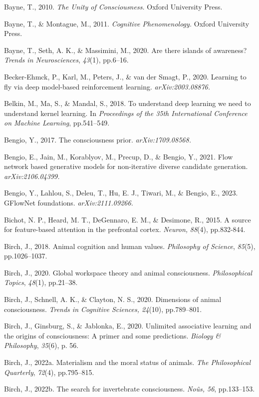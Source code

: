 \documentclass[12pt]{article}
\begin{document}
Bayne, T., 2010. \emph{The Unity of Consciousness.} Oxford University
Press.

Bayne, T., \& Montague, M., 2011. \emph{Cognitive Phenomenology.} Oxford
University Press.

Bayne, T., Seth, A. K., \& Massimini, M., 2020. Are there islands of
awareness? \emph{Trends in Neurosciences}, \emph{43}(1), pp.6--16.

Becker-Ehmck, P., Karl, M., Peters, J., \& van der Smagt, P., 2020.
Learning to fly via deep model-based reinforcement learning.
\emph{arXiv:2003.08876.}

Belkin, M., Ma, S., \& Mandal, S., 2018. To understand deep learning we
need to understand kernel learning. In \emph{Proceedings of the 35th
International Conference on Machine Learning}, pp.541--549.

Bengio, Y., 2017. The consciousness prior. \emph{arXiv:1709.08568.}

Bengio, E., Jain, M., Korablyov, M., Precup, D., \& Bengio, Y., 2021.
Flow network based generative models for non-iterative diverse candidate
generation. \emph{arXiv:2106.04399.}

Bengio, Y., Lahlou, S., Deleu, T., Hu, E. J., Tiwari, M., \& Bengio, E.,
2023. GFlowNet foundations. \emph{arXiv:2111.09266.}

Bichot, N. P., Heard, M. T., DeGennaro, E. M., \& Desimone, R., 2015. A
source for feature-based attention in the prefrontal cortex.
\emph{Neuron,} \emph{88}(4), pp.832-844.

Birch, J., 2018. Animal cognition and human values. \emph{Philosophy of
Science}, \emph{85}(5), pp.1026--1037.

Birch, J., 2020. Global workspace theory and animal consciousness.
\emph{Philosophical Topics}, \emph{48}(1), pp.21--38.

Birch, J., Schnell, A. K., \& Clayton, N. S., 2020. Dimensions of animal
consciousness. \emph{Trends in Cognitive Sciences, 24}(10), pp.789--801.

Birch, J., Ginsburg, S., \& Jablonka, E., 2020. Unlimited associative
learning and the origins of consciousness: A primer and some
predictions. \emph{Biology \& Philosophy}, \emph{35}(6), p. 56.

Birch, J., 2022a. Materialism and the moral status of animals. \emph{The
Philosophical Quarterly}, \emph{72}(4), pp.795--815.

Birch, J., 2022b. The search for invertebrate consciousness. \emph{Noûs,
56}, pp.133--153.
\end{document}
